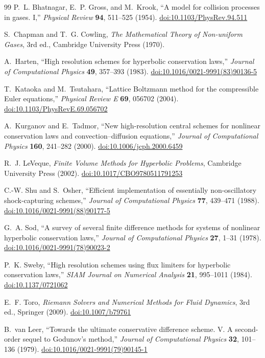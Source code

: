 \documentclass[11pt]{article}
\begin{document}
\begin{thebibliography}{99}
\small
{}
P.~L. Bhatnagar, E.~P. Gross, and M.~Krook, ``A model for collision processes in
gases. I,'' \emph{Physical Review} \textbf{94}, 511--525 (1954).
\href{https://doi.org/10.1103/PhysRev.94.511}{doi:10.1103/PhysRev.94.511}

S.~Chapman and T.~G. Cowling, \emph{The Mathematical Theory of Non-uniform Gases},
3rd ed., Cambridge University Press (1970).

A.~Harten, ``High resolution schemes for hyperbolic conservation laws,''
\emph{Journal of Computational Physics} \textbf{49}, 357--393 (1983).
\href{https://doi.org/10.1016/0021-9991(83)90136-5}{doi:10.1016/0021-9991(83)90136-5}

T.~Kataoka and M.~Tsutahara, ``Lattice Boltzmann method for the compressible Euler
equations,'' \emph{Physical Review E} \textbf{69}, 056702 (2004).
\href{https://doi.org/10.1103/PhysRevE.69.056702}{doi:10.1103/PhysRevE.69.056702}

A.~Kurganov and E.~Tadmor, ``New high-resolution central schemes for nonlinear
conservation laws and convection--diffusion equations,'' \emph{Journal of
Computational Physics} \textbf{160}, 241--282 (2000).
\href{https://doi.org/10.1006/jcph.2000.6459}{doi:10.1006/jcph.2000.6459}

R.~J. LeVeque, \emph{Finite Volume Methods for Hyperbolic Problems}, Cambridge
University Press (2002).
\href{https://doi.org/10.1017/CBO9780511791253}{doi:10.1017/CBO9780511791253}

C.-W. Shu and S.~Osher, ``Efficient implementation of essentially non-oscillatory
shock-capturing schemes,'' \emph{Journal of Computational Physics} \textbf{77},
439--471 (1988).
\href{https://doi.org/10.1016/0021-9991(88)90177-5}{doi:10.1016/0021-9991(88)90177-5}

G.~A. Sod, ``A survey of several finite difference methods for systems of nonlinear
hyperbolic conservation laws,'' \emph{Journal of Computational Physics}
\textbf{27}, 1--31 (1978).
\href{https://doi.org/10.1016/0021-9991(78)90023-2}{doi:10.1016/0021-9991(78)90023-2}

P.~K. Sweby, ``High resolution schemes using flux limiters for hyperbolic
conservation laws,'' \emph{SIAM Journal on Numerical Analysis} \textbf{21},
995--1011 (1984).
\href{https://doi.org/10.1137/0721062}{doi:10.1137/0721062}

E.~F. Toro, \emph{Riemann Solvers and Numerical Methods for Fluid Dynamics}, 3rd
ed., Springer (2009).
\href{https://doi.org/10.1007/b79761}{doi:10.1007/b79761}

B.~van Leer, ``Towards the ultimate conservative difference scheme. V. A
second-order sequel to Godunov's method,'' \emph{Journal of Computational Physics}
\textbf{32}, 101--136 (1979).
\href{https://doi.org/10.1016/0021-9991(79)90145-1}{doi:10.1016/0021-9991(79)90145-1}
\end{thebibliography}
\end{document}
